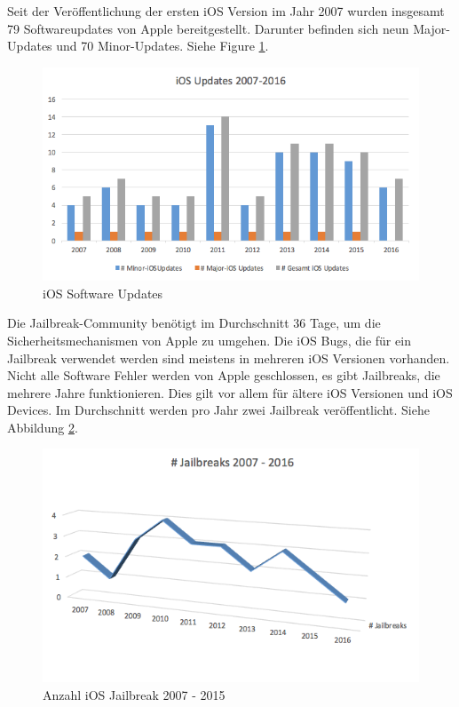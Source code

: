 Seit der Veröffentlichung der ersten iOS Version im Jahr 2007 wurden insgesamt 79 Softwareupdates von Apple bereitgestellt. Darunter befinden sich neun Major-Updates und 70  Minor-Updates. Siehe Figure \ref{fig:iOS Software Updates}.

\begin{figure}[!ht]
        \centering
                \includegraphics[scale=0.7]{Bilder/iOSUpdates1}
        \caption{iOS Software Updates\cite{Apple[7]}}
        	\label{fig:iOS Software Updates}
\end{figure}

Die Jailbreak-Community benötigt im Durchschnitt 36 Tage, um die Sicherheitsmechanismen von Apple zu umgehen. Die iOS Bugs, die für ein Jailbreak verwendet werden sind meistens in mehreren iOS Versionen vorhanden. Nicht alle Software Fehler werden von Apple geschlossen, es gibt Jailbreaks, die mehrere Jahre funktionieren. Dies gilt vor allem für ältere iOS Versionen und iOS Devices. Im Durchschnitt werden pro Jahr zwei Jailbreak veröffentlicht. Siehe Abbildung \ref{fig:iOS Jailbreak}.

\begin{figure}[!ht]
        \centering
                \includegraphics[scale=0.7]{Bilder/AnzahlJB}
        \caption{Anzahl iOS Jailbreak 2007 - 2015}
        	\label{fig:iOS Jailbreak}
\end{figure}


